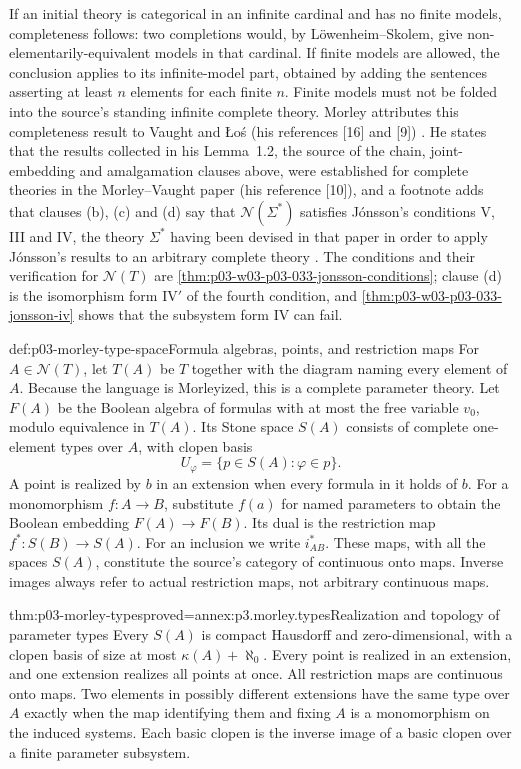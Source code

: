 If an initial theory is categorical in an infinite cardinal and has no
finite models, completeness follows: two completions would, by
L\"owenheim--Skolem, give non-elementarily-equivalent models in that
cardinal. If finite models are allowed, the conclusion applies to its
infinite-model part, obtained by adding the sentences asserting at least
\(n\) elements for each finite \(n\). Finite models must not be folded
into the source's standing infinite complete theory. Morley attributes
this completeness result to Vaught and Łoś (his references [16] and [9])
\cite[p.~516]{Morley1965}. He states that the results collected in his
Lemma~1.2, the source of the chain, joint-embedding and amalgamation
clauses above, were established for complete theories in the
Morley--Vaught paper (his reference [10]), and a footnote adds that
clauses (b), (c) and (d) say that \(\mathcal N(\Sigma^*)\) satisfies
Jónsson's conditions V, III and IV, the theory \(\Sigma^*\) having been
devised in that paper in order to apply Jónsson's results to an arbitrary
complete theory \cite[p.~517 and n.~5]{Morley1965}. The conditions and
their verification for \(\mathcal N(T)\) are
\cref{thm:p03-w03-p03-033-jonsson-conditions}; clause (d) is the
isomorphism form IV\('\) of the fourth condition, and
\cref{thm:p03-w03-p03-033-jonsson-iv} shows that the subsystem form IV
can fail.

\begin{hbdefinition}{def:p03-morley-type-space}{Formula algebras, points, and restriction maps}
For \(A\in\mathcal N(T)\), let \(T(A)\) be \(T\) together with the
diagram naming every element of \(A\). Because the language is
Morleyized, this is a complete parameter theory. Let \(F(A)\) be the
Boolean algebra of formulas with at most the free variable \(v_0\),
modulo equivalence in \(T(A)\). Its Stone space \(S(A)\) consists of
complete one-element types over \(A\), with clopen basis
\[
 U_\varphi=\{p\in S(A):\varphi\in p\}.
\]
A point is realized by \(b\) in an extension when every formula in it
holds of \(b\). For a monomorphism \(f:A\to B\), substitute
\(f(a)\) for named parameters to obtain the Boolean embedding
\(F(A)\to F(B)\). Its dual is the restriction map
\(f^*:S(B)\to S(A)\). For an inclusion we write \(i_{AB}^*\).
These maps, with all the spaces \(S(A)\), constitute the source's
category of continuous onto maps. Inverse images always refer to
actual restriction maps, not arbitrary continuous maps.
\end{hbdefinition}

\begin{hblemma}{thm:p03-morley-types}{proved=annex:p3.morley.types}{Realization and topology of parameter types}
Every \(S(A)\) is compact Hausdorff and zero-dimensional, with a
clopen basis of size at most \(\kappa(A)+\aleph_0\).
Every point is realized in an extension, and one extension realizes
all points at once. All restriction maps are continuous onto maps.
Two elements in possibly different extensions have the same type over
\(A\) exactly when the map identifying them and fixing \(A\) is a
monomorphism on the induced systems. Each basic clopen is the inverse
image of a basic clopen over a finite parameter subsystem.
\end{hblemma}

